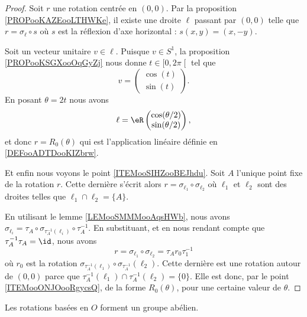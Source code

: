 \begin{proof}
	Soit \( r\) une rotation centrée en \( (0,0)\). Par la proposition \ref{PROPooKAZEooLTHWKe}, il existe une droite \( \ell\) passant par \( (0,0)\) telle que \( r=\sigma_{\ell} \circ s\) où \( s\) est la réflexion d'axe horizontal : \( s(x,y)=(x,-y)\).

	Soit un vecteur unitaire \( v\in \ell\). Puisque \( v\in S^1\), la proposition \ref{PROPooKSGXooOqGyZj} nous donne \( t\in \mathopen[ 0 ,2\pi  \mathclose[\) tel que
	\begin{equation}
		v=\begin{pmatrix}
			\cos(t) \\
			\sin(t)
		\end{pmatrix}.
	\end{equation}
	En posant \( \theta=2 t\) nous avons
	\begin{equation}
		\ell=\eR\begin{pmatrix}
			\cos(\theta/2) \\
			\sin(\theta/2)
		\end{pmatrix},
	\end{equation}
	et donc \( r=R_0(\theta)\) qui est l'application linéaire définie en \ref{DEFooADTDooKIZbrw}.

	Et enfin nous voyons le point \ref{ITEMooSIHZooBEJhdu}. Soit \( A\) l'unique point fixe de la rotation \( r\). Cette dernière s'écrit alors \( r=\sigma_{\ell_1}\circ\sigma_{\ell_2}\) où \( \ell_1\) et \( \ell_2\) sont des droites telles que \( \ell_1\cap\ell_2=\{ A \}\).

	En utilisant le lemme \ref{LEMooSMMMooAqsHWb}, nous avons \( \sigma_{\ell_i}=\tau_A\circ \sigma_{\tau_A^{-1}(\ell_i)}\circ \tau_A^{-1}\). En substituant, et en nous rendant compte que \( \tau_A^{-1}\tau_A=\id\), nous avons
	\begin{equation}
		r=\sigma_{\ell_1}\circ\sigma_{\ell_2}=\tau_A r_0\tau_1^{-1}
	\end{equation}
	où \( r_0\) est la rotation \( \sigma_{\tau_A^{-1}(\ell_1)}\circ \sigma_{\tau_A^{-1}}(\ell_2)\). Cette dernière est une rotation autour de \( (0,0)\) parce que \( \tau_A^{-1}(\ell_1)\cap \tau_A^{-1}(\ell_2)=\{ 0 \}\). Elle est donc, par le point \ref{ITEMooONJOooRgycsQ}, de la forme \( R_0(\theta)\), pour une certaine valeur de \( \theta\).
\end{proof}

\begin{proposition}      \label{PROPooWMESooNJMdxf}
	Les rotations basées en \( O\) forment un groupe abélien.
\end{proposition}

